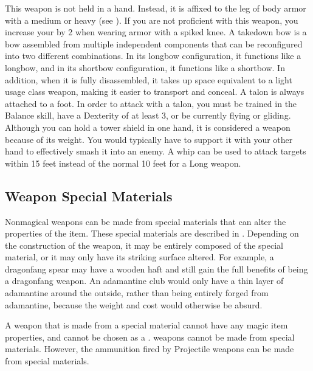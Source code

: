          This weapon is not held in a hand.
        Instead, it is affixed to the leg of body armor with a medium or heavy  (see ).
        If you are not proficient with this weapon, you increase your  by 2 when wearing armor with a spiked knee.
         A takedown bow is a bow assembled from multiple independent components that can be reconfigured into two different combinations.
        In its longbow configuration, it functions like a longbow, and in its shortbow configuration, it functions like a shortbow.
        In addition, when it is fully disassembled, it takes up space equivalent to a light usage class weapon, making it easier to transport and conceal.
         A talon is always attached to a foot.
        In order to attack with a talon, you must be trained in the Balance skill, have a Dexterity of at least 3, or be currently flying or gliding.
         Although you can hold a tower shield in one hand, it is considered a  weapon because of its weight.
        You would typically have to support it with your other hand to effectively smash it into an enemy.
         A whip can be used to attack targets within 15 feet instead of the normal 10 feet for a Long weapon.

    \subsection{Weapon Special Materials}\label{Weapon Special Materials}
        Nonmagical weapons can be made from special materials that can alter the properties of the item.
        These special materials are described in .
        Depending on the construction of the weapon, it may be entirely composed of the special material, or it may only have its striking surface altered.
        For example, a dragonfang spear may have a wooden haft and still gain the full benefits of being a dragonfang weapon.
        An adamantine club would only have a thin layer of adamantine around the outside, rather than being entirely forged from adamantine, because the weight and cost would otherwise be absurd.

        A weapon that is made from a special material cannot have any magic item properties, and cannot be chosen as a .
         weapons cannot be made from special materials.
        However, the ammunition fired by Projectile weapons can be made from special materials.

